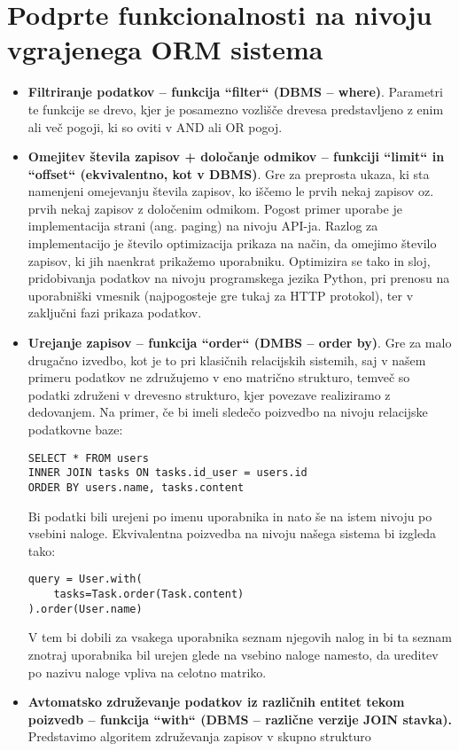 \documentclass[a4paper,12pt,openright]{book}
\begin{document}
    \section{Podprte funkcionalnosti na nivoju vgrajenega ORM sistema}
    \begin{itemize}
        \item \textbf{Filtriranje podatkov – funkcija ``filter`` (DBMS – where)}. Parametri te funkcije se drevo, kjer je posamezno vozlišče drevesa predstavljeno z enim ali več pogoji, ki so oviti v AND ali OR pogoj.
        \item \textbf{Omejitev števila zapisov + določanje odmikov – funkciji ``limit`` in ``offset`` (ekvivalentno, kot v DBMS)}. Gre za preprosta ukaza, ki sta namenjeni omejevanju števila zapisov, ko iščemo le prvih nekaj zapisov oz. prvih nekaj zapisov z določenim odmikom. Pogost primer uporabe je implementacija strani (ang. paging) na nivoju API-ja. Razlog za implementacijo je število optimizacija prikaza na način, da omejimo število zapisov, ki jih naenkrat prikažemo uporabniku. Optimizira se tako in sloj, pridobivanja podatkov na nivoju programskega jezika Python, pri prenosu na uporabniški vmesnik (najpogosteje gre tukaj za HTTP protokol), ter v zaključni fazi prikaza podatkov.
        \item \textbf{Urejanje zapisov – funkcija ``order`` (DMBS – order by)}. Gre za malo drugačno izvedbo, kot je to pri klasičnih relacijskih sistemih, saj v našem primeru podatkov ne združujemo v eno matrično strukturo, temveč so podatki združeni v drevesno strukturo, kjer povezave realiziramo z dedovanjem. Na primer, če bi imeli sledečo poizvedbo na nivoju relacijske podatkovne baze:

\begin{verbatim}
SELECT * FROM users
INNER JOIN tasks ON tasks.id_user = users.id
ORDER BY users.name, tasks.content
\end{verbatim}

        Bi podatki bili urejeni po imenu uporabnika in nato še na istem nivoju po vsebini naloge. Ekvivalentna poizvedba na nivoju našega sistema bi izgleda tako:

\begin{verbatim}
query = User.with(
    tasks=Task.order(Task.content)
).order(User.name)
\end{verbatim}

        V tem bi dobili za vsakega uporabnika seznam njegovih nalog in bi ta seznam znotraj uporabnika bil urejen glede na vsebino naloge namesto, da ureditev po nazivu naloge vpliva na celotno matriko.
        
        \item \textbf{Avtomatsko združevanje podatkov iz različnih entitet tekom poizvedb – funkcija ``with`` (DBMS – različne verzije JOIN stavka).}
        \colorbox{BurntOrange}{Predstavimo algoritem združevanja zapisov v skupno strukturo}
    \end{itemize}
\end{document}
